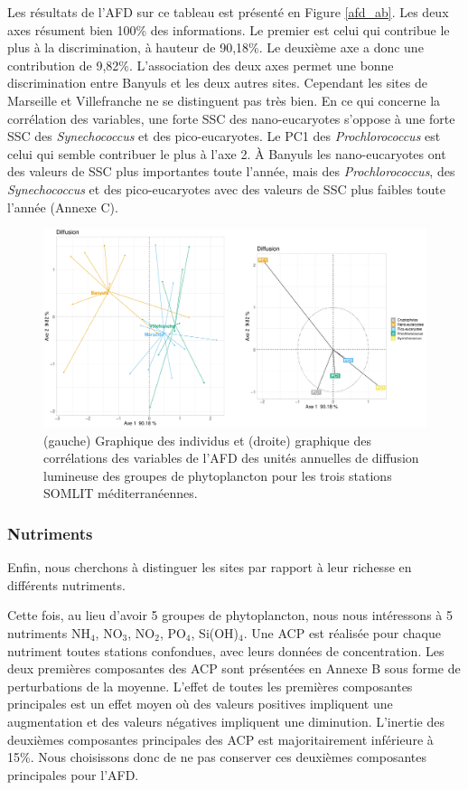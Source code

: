 \documentclass[12pt]{article}
\begin{document}
Les résultats de l’AFD sur ce tableau est présenté en Figure \ref{afd_ab}. Les deux axes résument bien 100\% des informations. Le premier est celui qui contribue le plus à la discrimination, à hauteur de 90,18\%. Le deuxième axe a donc une contribution de 9,82\%. L’association des deux axes permet une bonne discrimination entre Banyuls et les deux autres sites. Cependant les sites de Marseille et Villefranche ne se distinguent pas très bien. En ce qui concerne la corrélation des variables, une forte SSC des nano-eucaryotes s’oppose à une forte SSC des \textit{Synechococcus} et des pico-eucaryotes. Le PC1 des \textit{Prochlorococcus} est celui qui semble contribuer le plus à l’axe 2. À Banyuls les nano-eucaryotes ont des valeurs de SSC plus importantes toute l’année, mais des \textit{Prochlorococcus}, des \textit{Synechococcus} et des pico-eucaryotes avec des valeurs de SSC plus faibles toute l’année (Annexe C). 



\begin{figure}
\centering
\includegraphics[width=.95\textwidth]{fig/R224_FDA_diff.pdf}
\caption{(gauche) Graphique des individus et (droite) graphique des corrélations des variables de l'AFD des unités annuelles de diffusion lumineuse des groupes de phytoplancton pour les trois stations SOMLIT méditerranéennes.}
\label{afd_diff}
\end{figure}

\subsubsection{Nutriments}

Enfin, nous cherchons à distinguer les sites par rapport à leur richesse en différents nutriments. 

Cette fois, au lieu d’avoir 5 groupes de phytoplancton, nous nous intéressons à 5 nutriments NH$_4$, NO$_3$, NO$_2$, PO$_4$, Si(OH)$_4$. Une ACP est réalisée pour chaque nutriment toutes stations confondues, avec leurs données de concentration. Les deux premières composantes des ACP sont présentées en Annexe B sous forme de perturbations de la moyenne. L’effet de toutes les premières composantes principales est un effet moyen où des valeurs positives impliquent une augmentation et des valeurs négatives impliquent une diminution. L’inertie des deuxièmes composantes principales des ACP est majoritairement inférieure à 15\%. Nous choisissons donc de ne pas conserver ces deuxièmes composantes principales pour l’AFD.
\end{document}
